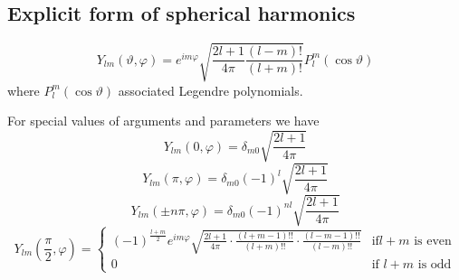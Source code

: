 \subsection[Explicit form ...]{Explicit form of spherical harmonics}
\begin{equation}
Y_{lm}(\vartheta,\varphi)=e^{im\varphi}\sqrt{\frac{2l+1}{4\pi}\frac{(l-m)!}{(l+m)!}}P_l^m(\cos \vartheta)
\end{equation}
where $P_l^m(\cos \vartheta)$ associated Legendre polynomials.
\par{For special values of arguments and parameters we have}
\begin{equation}
Y_{lm}(0,\varphi)=\delta_{m0}\sqrt{\frac{2l+1}{4\pi}}
\end{equation}
\begin{equation}
Y_{lm}(\pi,\varphi)=\delta_{m0}(-1)^l\sqrt{\frac{2l+1}{4\pi}}
\end{equation}
\begin{equation}
Y_{lm}(\pm n\pi,\varphi)=\delta_{m0}(-1)^{nl}\sqrt{\frac{2l+1}{4\pi}}
\end{equation}
\begin{equation}
Y_{lm}(\frac{\pi}{2},\varphi)=\left\{\begin{array}{lc}
(-1)^{\frac{l+m}{2}}e^{im\varphi}\sqrt{\frac{2l+1}{4\pi}\cdot
  \frac{(l+m-1)!!}{(l+m)!!}\cdot \frac{(l-m-1)!!}{(l-m)!!}} & \text{if
}l+m\text{ is even}\\
0 & \text{if }l+m\text{ is odd}
\end{array}
\right.
\end{equation}
